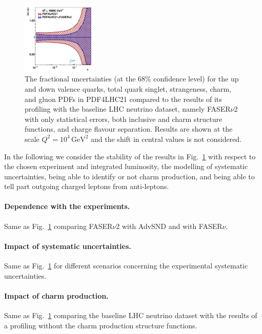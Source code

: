 \begin{figure}[t]
\includegraphics[width=0.32\textwidth]{./figs_xFitter/FASERv2_q2_10000_pdf_Sea_ratio.pdf}
\caption{The fractional uncertainties (at the 68\% confidence level)
for the up and down valence quarks, total quark singlet, strangeness, charm, and gluon PDFs
in PDF4LHC21 compared to the results of its profiling with the baseline LHC neutrino dataset, namely
FASER$\nu$2 with only statistical errors, both inclusive and charm structure functions,  and charge flavour
separation.
%
Results are shown at the scale $Q^2 = 10^4 \, \textrm{GeV}^2$ and the shift in central values
is not considered.}
\label{fig:profiling_baseline}
\end{figure}

In the following we consider the stability of the results in Fig.~\ref{fig:profiling_baseline}
with respect to the chosen experiment and integrated luminosity, the modelling of systematic
uncertainties, being able to identify or not charm production, and being able to tell part outgoing
charged leptons from anti-leptons.

\paragraph{Dependence with the experiments.}
%
Same as Fig.~\ref{fig:profiling_baseline} comparing FASER$\nu$2 with AdvSND and with FASER$\nu$.

\paragraph{Impact of systematic uncertainties.}
%
Same as Fig.~\ref{fig:profiling_baseline} for different scenarios concerning the experimental
systematic uncertainties.

\paragraph{Impact of charm production.}
%
Same as Fig.~\ref{fig:profiling_baseline} comparing the baseline LHC neutrino dataset with the results
of a profiling without the charm production structure functions.

